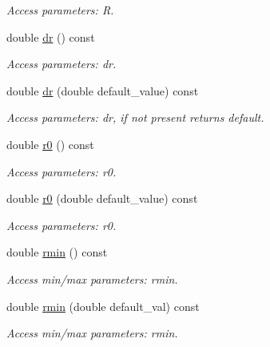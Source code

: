 \begin{DoxyCompactItemize}
\begin{DoxyCompactList}\small\item\em Access parameters: R. \item\end{DoxyCompactList}\item 
double \hyperlink{struct_d_d4hep_1_1_x_m_l_1_1_dimension_a0a69f1789a233b07247116e5085c0ea2}{dr} () const 
\begin{DoxyCompactList}\small\item\em Access parameters: dr. \item\end{DoxyCompactList}\item 
double \hyperlink{struct_d_d4hep_1_1_x_m_l_1_1_dimension_a8d34918332fceb9fb20a2dc5e25e4a3c}{dr} (double default\_\-value) const 
\begin{DoxyCompactList}\small\item\em Access parameters: dr, if not present returns default. \item\end{DoxyCompactList}\item 
double \hyperlink{struct_d_d4hep_1_1_x_m_l_1_1_dimension_a5e63c5a7342680a26da7ea793b7f1c1e}{r0} () const 
\begin{DoxyCompactList}\small\item\em Access parameters: r0. \item\end{DoxyCompactList}\item 
double \hyperlink{struct_d_d4hep_1_1_x_m_l_1_1_dimension_af075edc02c038dce4043603f9c573632}{r0} (double default\_\-value) const 
\begin{DoxyCompactList}\small\item\em Access parameters: r0. \item\end{DoxyCompactList}\item 
double \hyperlink{struct_d_d4hep_1_1_x_m_l_1_1_dimension_a8caa588fa3e1be7e5eed684cc962abc4}{rmin} () const 
\begin{DoxyCompactList}\small\item\em Access min/max parameters: rmin. \item\end{DoxyCompactList}\item 
double \hyperlink{struct_d_d4hep_1_1_x_m_l_1_1_dimension_aed981615e11c304f936c48f8da6e94ee}{rmin} (double default\_\-val) const 
\begin{DoxyCompactList}\small\item\em Access min/max parameters: rmin. \item\end{DoxyCompactList}\item 

\end{DoxyCompactItemize}
